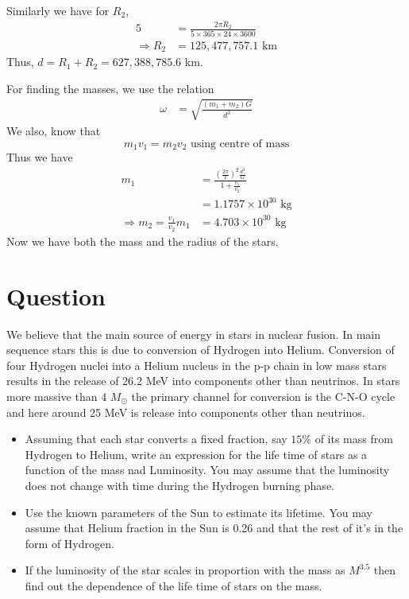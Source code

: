 \documentclass[paper=a4, fontsize=11pt]{scrartcl} %
\numberwithin{equation}{section} %
\numberwithin{figure}{section} %
\numberwithin{table}{section} %
\begin{document}
	Similarly we have for $R_2$,
	\begin{equation}
	\begin{split}
		5 &= \frac{2\pi R_2}{5\times 365\times 24\times 3600} \\
		\Rightarrow R_2 &=125,477,757.1 \text{ km}
	\end{split}
	\end{equation}
	Thus, $d=R_1 + R_2 = 627,388,785.6$ km.
	\par
	For finding the masses, we use the relation
	\begin{equation}
	\begin{split}
		\omega &=\sqrt{\frac{(m_1+m_2)G}{d^3}}
	\end{split}
	\end{equation}
	We also, know that 
	\begin{equation}
		m_1v_1=m_2v_2 \text{ using centre of mass}
	\end{equation}
	Thus we have
	\begin{equation}
	\begin{split}
		m_1 & = \frac{ \left( \frac{2\pi}{T} \right)^2 \frac{d^3}{G}}{1 + \frac{v_1}{v_2}} \\
		& = 1.1757\times 10^{30} \text{ kg} \\
		\Rightarrow m_2=\frac{v_1}{v_2}m_1&=4.703\times10^{30} \text{ kg}
	\end{split}
	\end{equation}
	Now we have both the mass and the radius of the stars.

\section{Question}
	We believe that the main source of energy in stars in nuclear fusion. In main sequence stars this is due to conversion of Hydrogen into Helium. Conversion of four Hydrogen nuclei into a Helium nucleus in the p-p chain in low mass stars results in the release of 26.2 MeV into components other than neutrinos. In stars more massive than 4 $M_\odot$ the primary channel for conversion is the C-N-O cycle and here around 25 MeV is release into components other than neutrinos.
	\begin{itemize}
		\item Assuming that each star converts a fixed fraction, say $15\%$ of its mass from Hydrogen to Helium, write an expression for the life time of stars as a function of the mass nad Luminosity. You may assume that the luminosity does not change with time during the Hydrogen burning phase.
		\item Use the known parameters of the Sun to estimate its lifetime. You may assume that Helium fraction in the Sun is 0.26 and that the rest of it's in the form of Hydrogen.
		\item If the luminosity of the star scales in proportion with the mass as $M^{3.5}$ then find out the dependence of the life time of stars on the mass.
	\end{itemize}
\end{document}
